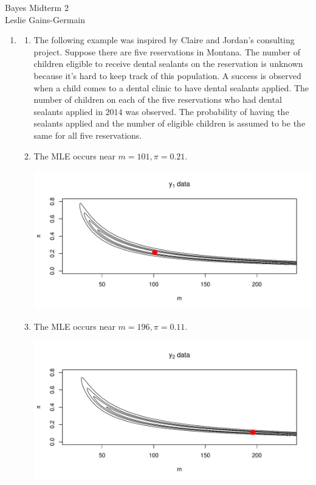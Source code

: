 \documentclass[12pt]{article}\usepackage[]{graphicx}\usepackage[]{color}
\newenvironment{knitrout}{}{} %
\begin{document}
  
  
\begin{center}
\large{Bayes Midterm 2} \\
Leslie Gains-Germain
\end{center}

\begin{enumerate}

\item \begin{enumerate}

\item The following example was inspired by Claire and Jordan's consulting project. Suppose there are five reservations in Montana. The number of children eligible to receive dental sealants on the reservation is unknown because it's hard to keep track of this population. A success is observed when a child comes to a dental clinic to have dental sealants applied. The number of children on each of the five reservations who had dental sealants applied in $2014$ was observed. The probability of having the sealants applied and the number of eligible children is assumed to be the same for all five reservations. 

\item The MLE occurs near $m=101, \pi=0.21$. 

\begin{knitrout}\footnotesize
{}\color{fgcolor}
\includegraphics[width=\linewidth]{figure/likelihood-1} 

\end{knitrout}

\item The MLE occurs near $m=196, \pi=0.11$. 

\begin{knitrout}\footnotesize
{}\color{fgcolor}
\includegraphics[width=\linewidth]{figure/likelihood2-1} 


\end{knitrout}
\end{enumerate}
\end{enumerate}
\end{document}
